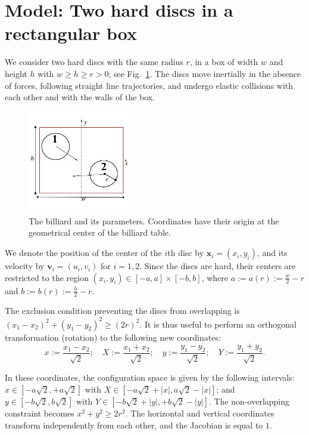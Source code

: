 \documentclass[superscriptaddress,pre,reprint,showpacs,onecolumn]{revtex4-1}
\newcommand{\defeq}{:=}
\begin{document}
\section{Model: Two hard discs in a rectangular box}

We consider two hard discs with the same radius $r$,
in a box of width $w$ and height $h$ with $w \ge h \ge r >0$; see Fig.~\ref{billar01}.
The discs move inertially in the absence of forces, 
following straight line trajectories,
and undergo elastic collisions with each 
other and with the walls of the box.

\begin{figure}[h]
  \begin{center}
  \includegraphics[width=0.40\textwidth]{FigurasPerfectas/DiscosenCajaCuadrada01.pdf}
  \end{center}
  \caption{The billiard and its parameters. Coordinates
    have their origin at the geometrical center of the 
    billiard table.}\label{billar01}
\end{figure}


We denote the position of the center of the $i$th disc by 
$\mathbf{x}_i = (x_i, y_i)$, and its velocity by $\mathbf{v}_i = (u_i, v_i)$ for $i=1,2$. Since the discs are hard, 
their centers are restricted to the region 
$(x_i, y_i) \in [-a,a] \times [-b, b]$, where 
$a \defeq a(r) \defeq \frac{w}{2} - r $ and
$b \defeq b(r) \defeq \frac{h}{2} - r $.

The exclusion condition preventing the discs from overlapping is $(x_1-x_2)^2 + (y_1-y_2)^2 \ge (2r)^2$.
It is thus useful to perform an orthogonal transformation (rotation) to the following new coordinates:
\begin{equation}\label{cambiocoor01}
 x \defeq \frac{x_1 - x_2}{\sqrt{2}}; 
\quad X \defeq \frac{x_1 + x_2}{\sqrt{2}}; 
\quad y \defeq \frac{y_1 - y_2}{\sqrt{2}}; 
\quad Y \defeq \frac{y_1 + y_2}{\sqrt{2}}.
\end{equation}

In these coordinates, the configuration space is given by the following
intervals:
$x \in [-a \sqrt{2}, +a \sqrt{2}]$ with 
$X \in [-a \sqrt{2} + |x|, a \sqrt{2} - |x|]$; and 
 $y \in [-b \sqrt{2}, b \sqrt{2}]$ with $Y \in [-b \sqrt{2} + |y|, +b \sqrt{2} - |y|]$.
The non-overlapping constraint becomes $x^2 + y^2 \ge 2 r^2$.
The horizontal and vertical coordinates transform independently
from each other, and the Jacobian is  equal to $1$.
\end{document}
